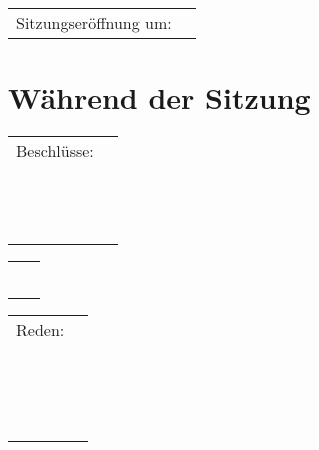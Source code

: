 \documentclass{sasbase}
\begin{document}
\begin{tabular}{p{4cm}p{14cm}}
    Sitzungser\"{o}ffnung um: & \dotfill \\
\end{tabular}

\section{W\"{a}hrend der Sitzung}

\begin{tabular}{p{4cm}p{14cm}}
    Beschlüsse: & \dotfill \\[2mm]
    & \dotfill \\[2mm]
    & \dotfill \\[2mm]
    & \dotfill \\[2mm]
    & \dotfill \\[2mm]
    & \dotfill \\[2mm]
    & \dotfill \\[2mm]
    & \dotfill \\[2mm]
    & \dotfill \\[2mm]
    & \dotfill \\[2mm]
    & \dotfill \\[2mm]
    & \dotfill \\[2mm]
    & \dotfill \\[2mm]
    & \dotfill \\[2mm]
\end{tabular}

\begin{tabular}{p{4cm}p{14cm}}
    & \dotfill \\[2mm]
    & \dotfill \\[2mm]
    & \dotfill \\[2mm]
    & \dotfill \\[2mm]
    & \dotfill \\[2mm]
    & \dotfill \\[2mm]
\end{tabular}

\begin{tabular}{p{4cm}p{14cm}}
    Reden: & \dotfill \\[2mm]
    & \dotfill \\[2mm]
    & \dotfill \\[2mm]
    & \dotfill \\[2mm]
    & \dotfill \\[2mm]
    & \dotfill \\[2mm]
    & \dotfill \\[2mm]
    & \dotfill \\[2mm]
    & \dotfill \\[2mm]
    & \dotfill \\[2mm]
    & \dotfill \\[2mm]
    & \dotfill \\[2mm]
    & \dotfill \\[2mm]
    & \dotfill \\[2mm]
    & \dotfill \\[2mm]
    & \dotfill \\[2mm]
    & \dotfill \\[2mm]
\end{tabular}
\end{document}
